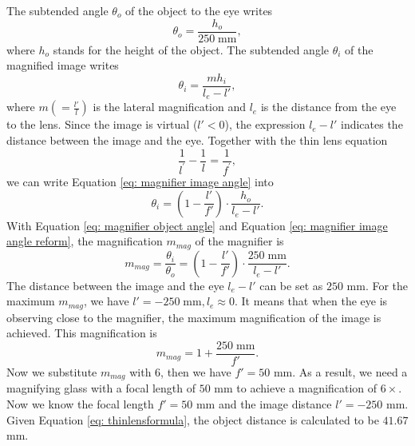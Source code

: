 The subtended angle $\theta_o$ of the object to the eye writes 
\begin{equation}
\label{eq: magnifier object angle}
\theta_o = \frac{h_o}{250 \; \text{mm}},
\end{equation}where $h_o$ stands for the height of the object.
The subtended angle $\theta_i$ of  the magnified image writes
\begin{equation}
\label{eq: magnifier image angle}
\theta_i = \frac{mh_i}{l_e-l'},
\end{equation}where $m (= \frac{l'}{l})$ is the lateral magnification and $l_e$ is  the distance from the eye to the lens. Since the image is virtual ($l'<0$), the expression $l_e - l'$ indicates the distance between the image and the eye. Together with the thin lens equation 
\begin{equation} \label{eq: thinlensformula}
    \frac{1}{l^\prime} - \frac{1}{l} = \frac{1}{f^\prime},
\end{equation}we can write Equation \ref{eq: magnifier image angle} into
\begin{equation}
\label{eq: magnifier image angle reform}
\theta_i = (1-\frac{l'}{f'})\cdot\frac{h_o}{l_e-l'}.
\end{equation}With Equation \ref{eq: magnifier object angle} and Equation \ref{eq: magnifier image angle reform}, the magnification $m_{mag}$ of the magnifier is 
\begin{equation}
\label{eq: magnifier magnification}
m_{mag} = \frac{\theta_i}{\theta_o} = (1-\frac{l'}{f'})\cdot\frac{250 \; \text{mm}}{l_e-l'}.
\end{equation}The distance between the image and the eye $l_e-l'$ can be set as $250 $ mm. For the maximum $m_{mag}$, we have $l' = -250 \; \text{mm}, l_e \approx 0$. It means that when the eye is observing close to the magnifier, the maximum magnification of the image is achieved. This magnification is
\begin{equation}
\label{eq: magnifier magnification simplified}
m_{mag}  = 1+\frac{250 \; \text{mm}}{f'}.
\end{equation}Now we substitute $m_{mag}$ with $6$, then we have $f' = 50 $ mm. As a result, we need a magnifying glass with a focal length of $50 $ mm to achieve a magnification of  $6\times$.
Now we know the focal length  $f' = 50 $ mm and the image distance $l' = -250 $ mm. Given Equation \ref{eq: thinlensformula}, the object distance is calculated to be $41.67 $ mm.  

